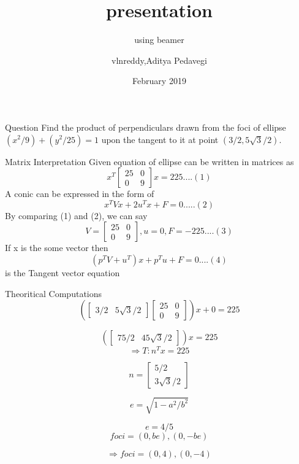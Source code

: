 \documentclass{beamer}
\title{presentation}
\subtitle{using beamer}
\author{vlnreddy,Aditya Pedavegi }
\date{February 2019}
\begin{document}
\maketitle
\begin{frame}{Question}
Find the product of perpendiculars drawn from the foci of ellipse $(x^2/9) + (y^2/25) = 1$ upon the tangent to it at point $(3/2 ,5\sqrt3/2) $.

 \end{frame}
 
 \begin{frame}{Matrix Interpretation}
 Given equation of ellipse can be written in matrices as
\begin{equation*}
x^T 
\begin{bmatrix}
25 & 0
\\
0 & 9
\end{bmatrix}
x = 225 ....(1)
\end{equation*}
A conic can be expressed in the form of
\begin{equation*}
    x^T V x + 2u^T x + F = 0.....       (2)
\end{equation*}
By comparing (1) and (2), we can say
\begin{equation*}
    V = \begin{bmatrix}
    25 & 0
    \\
    0 & 9
    \end{bmatrix},
    u = 0, F = -225 ....(3)
\end{equation*}
If x is the some vector then
\begin{equation*}
  (p^T V + u^T )x + p^T u + F = 0 ....(4)
\end{equation*}
     is the Tangent vector equation
 \end{frame}
 
 \begin{frame}{Theoritical Computations}
 $$(
\begin{bmatrix}
3/2 & 5\sqrt{3}/2
\end{bmatrix}
\begin{bmatrix}
25 & 0 \\
0 & 9 
\end{bmatrix}
)x + 0 = 225 $$

$$(
\begin{bmatrix}
75/2 & 45\sqrt3/2
\end{bmatrix}
)x = 225 $$
$$\Rightarrow{} T : n^T x = 225$$

$$n = 
\begin{bmatrix}
5/2 \\
3\sqrt3/2
\end{bmatrix}$$

$$e = \sqrt{1-a^2/b^2}$$

$$ e = 4/5 $$
$$ foci = (0,be),(0,-be)$$

$$\Rightarrow{} foci = (0,4),(0,-4)$$
      
\end{frame}
\end{document}
